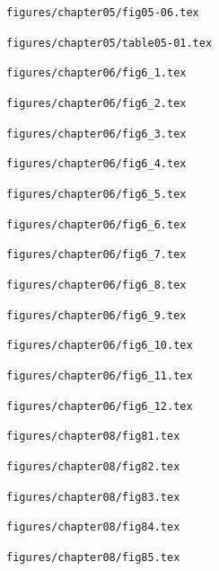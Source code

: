 \documentclass[11pt,a4paper]{article}
\begin{document}
\clearpage
\noindent\texttt{figures/chapter05/fig05-06.tex}


\clearpage
\noindent\texttt{figures/chapter05/table05-01.tex}


\clearpage
\noindent\texttt{figures/chapter06/fig6\_1.tex}


\clearpage
\noindent\texttt{figures/chapter06/fig6\_2.tex}


\clearpage
\noindent\texttt{figures/chapter06/fig6\_3.tex}


\clearpage
\noindent\texttt{figures/chapter06/fig6\_4.tex}


\clearpage
\noindent\texttt{figures/chapter06/fig6\_5.tex}


\clearpage
\noindent\texttt{figures/chapter06/fig6\_6.tex}


\clearpage
\noindent\texttt{figures/chapter06/fig6\_7.tex}


\clearpage
\noindent\texttt{figures/chapter06/fig6\_8.tex}


\clearpage
\noindent\texttt{figures/chapter06/fig6\_9.tex}


\clearpage
\noindent\texttt{figures/chapter06/fig6\_10.tex}


\clearpage
\noindent\texttt{figures/chapter06/fig6\_11.tex}


\clearpage
\noindent\texttt{figures/chapter06/fig6\_12.tex}


\clearpage
\noindent\texttt{figures/chapter08/fig81.tex}


\clearpage
\noindent\texttt{figures/chapter08/fig82.tex}


\clearpage
\noindent\texttt{figures/chapter08/fig83.tex}


\clearpage
\noindent\texttt{figures/chapter08/fig84.tex}


\clearpage
\noindent\texttt{figures/chapter08/fig85.tex}

\end{document}
